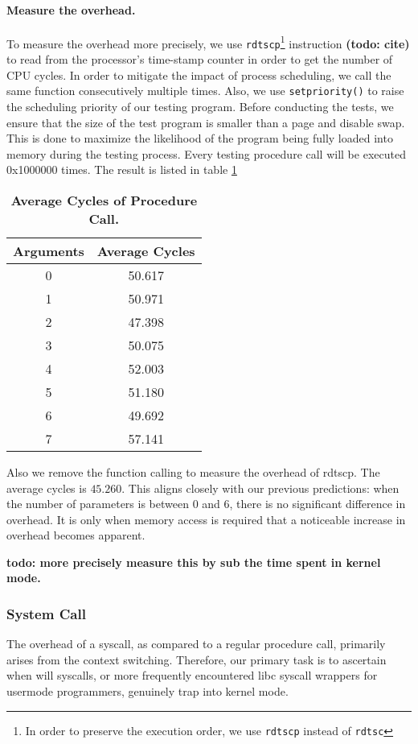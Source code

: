 \paragraph{Measure the overhead.} To measure the overhead more precisely, we use \texttt{rdtscp}\footnote{In order to preserve the execution order, we use \texttt{rdtscp} instead of \texttt{rdtsc}} instruction \textbf{(todo: cite)} to read from the processor’s time-stamp counter in order to get the number of CPU cycles. In order to mitigate the impact of process scheduling, we call the same function consecutively multiple times. Also, we use \texttt{setpriority()} to raise the scheduling priority of our testing program. Before conducting the tests, we ensure that the size of the test program is smaller than a page and disable swap. This is done to maximize the likelihood of the program being fully loaded into memory during the testing process. Every testing procedure call will be executed 0x1000000 times. The result is listed in table \ref{table:procedure-test}
\begin{table}[h]
	\centering
	\begin{tabular}{c|c}
		\hline
		\bf{Arguments} & \bf{Average Cycles} \\ \hline
		0 & 50.617 \\ \hline
		1 & 50.971 \\ \hline
		2 & 47.398 \\ \hline
        3 & 50.075 \\ \hline
        4 & 52.003 \\ \hline
        5 & 51.180 \\ \hline
        6 & 49.692 \\ \hline
        7 & 57.141 \\ \hline
	\end{tabular}
	\caption{\textbf{Average Cycles of Procedure Call.}}
	\label{table:procedure-test}
\end{table}
Also we remove the function calling to measure the overhead of rdtscp.
The average cycles is $45.260$. This aligns closely with our previous predictions: when the number of parameters is between 0 and 6, there is no significant difference in overhead. It is only when memory access is required that a noticeable increase in overhead becomes apparent.

\textbf{todo: more precisely measure this by sub the time spent in kernel mode.}

\subsubsection{System Call}
The overhead of a syscall, as compared to a regular procedure call, primarily arises from the context switching. Therefore, our primary task is to ascertain when will syscalls, or more frequently encountered libc syscall wrappers for usermode programmers, genuinely trap into kernel mode.

